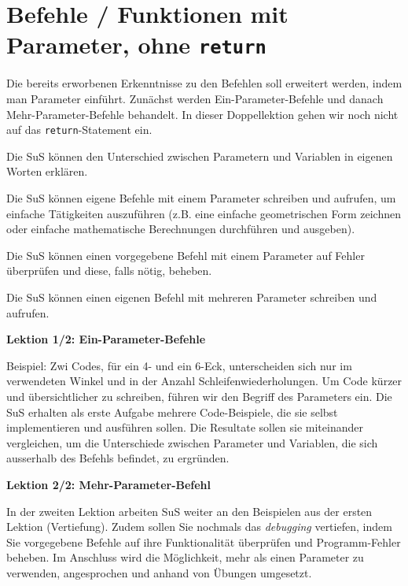 \section{Befehle / Funktionen mit Parameter, ohne \texorpdfstring{\lstinline|return|}{return}}
\begin{myExBox}
Die bereits erworbenen Erkenntnisse zu den Befehlen soll erweitert werden, indem man Parameter einführt. Zunächst werden Ein-Parameter-Befehle und danach Mehr-Parameter-Befehle behandelt. In dieser Doppellektion gehen wir noch nicht auf das \lstinline|return|-Statement ein. 


\begin{todolist}
    \item Die SuS können den Unterschied zwischen Parametern und Variablen in eigenen Worten erklären.
    \item Die SuS können eigene Befehle mit einem Parameter schreiben und aufrufen, um einfache Tätigkeiten auszuführen (z.B. eine einfache geometrischen Form zeichnen oder einfache mathematische Berechnungen durchführen und ausgeben).
    \item Die SuS können einen vorgegebene Befehl mit einem Parameter auf Fehler überprüfen und diese, falls nötig, beheben. 
    \item Die SuS können einen eigenen Befehl mit mehreren Parameter schreiben und aufrufen.
\end{todolist}

\textbf{Lektion 1/2: Ein-Parameter-Befehle}

Beispiel: Zwi Codes, für ein 4- und ein 6-Eck, unterscheiden sich nur im verwendeten Winkel und in der Anzahl Schleifenwiederholungen. Um Code kürzer und übersichtlicher zu schreiben, führen wir den Begriff des Parameters ein. Die SuS erhalten als erste Aufgabe mehrere Code-Beispiele, die sie selbst implementieren und ausführen sollen. Die Resultate sollen sie miteinander vergleichen, um die Unterschiede zwischen Parameter und Variablen, die sich ausserhalb des Befehls befindet, zu ergründen.

\textbf{Lektion 2/2: Mehr-Parameter-Befehl}

In der zweiten Lektion arbeiten SuS weiter an den Beispielen aus der ersten Lektion (Vertiefung). Zudem sollen Sie nochmals das \textit{debugging} vertiefen, indem Sie vorgegebene Befehle auf ihre Funktionalität überprüfen und Programm-Fehler beheben. Im Anschluss wird die Möglichkeit, mehr als einen Parameter zu verwenden, angesprochen und anhand von Übungen umgesetzt.


\end{myExBox}

